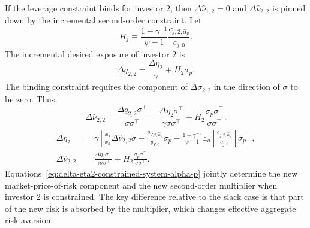 If the leverage constraint binds for investor $2$, then $\Delta\hat{\nu}_{1,2}=0$ and $\Delta\hat{\nu}_{2,2}$ is pinned down by the incremental second-order constraint.
Let
\begin{equation}
    H_j\equiv\frac{1-\gamma^{-1}}{\psi-1}\frac{c_{j,2,\hat{\alpha}_p}}{c_{j,0}}.
\end{equation}
The incremental desired exposure of investor $2$ is
\begin{equation}
    \Delta q_{2,2}=\frac{\Delta\eta_2}{\gamma}+H_2\sigma_p.
\end{equation}
The binding constraint requires the component of $\Delta\sigma_{2,2}$ in the direction of $\sigma$ to be zero.
Thus,
\begin{equation}\label{eq:delta-nu22-alpha-p}
    \Delta\hat{\nu}_{2,2}
    =\frac{\Delta q_{2,2}\sigma^\top}{\sigma\sigma^\top}
    =\frac{\Delta\eta_2\sigma^\top}{\gamma\sigma\sigma^\top}
    +H_2\frac{\sigma_p\sigma^\top}{\sigma\sigma^\top}.
\end{equation}
\begin{align}\label{eq:delta-eta2-constrained-system-alpha-p}
    \Delta\eta_2
    &=\gamma\left[
        \frac{x_2}{x_a}\Delta\hat{\nu}_{2,2}\sigma
        -\frac{y_{Y,2,\hat{\alpha}_p}}{y_{Y,0}}\sigma_p
        -\frac{1-\gamma^{-1}}{\psi-1}\mathbb{E}_a\left[\frac{c_{j,2,\hat{\alpha}_p}}{c_{j,0}}\right]\sigma_p
    \right],\\
    \Delta\hat{\nu}_{2,2}
    &=\frac{\Delta\eta_2\sigma^\top}{\gamma\sigma\sigma^\top}
    +H_2\frac{\sigma_p\sigma^\top}{\sigma\sigma^\top}.
\end{align}
Equations~\eqref{eq:delta-eta2-constrained-system-alpha-p} jointly determine the new market-price-of-risk component and the new second-order multiplier when investor $2$ is constrained.
The key difference relative to the slack case is that part of the new risk is absorbed by the multiplier, which changes effective aggregate risk aversion.

\bigskip

